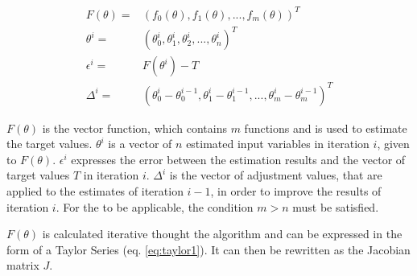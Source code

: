 \begin{align}
	F(\theta) =& (f_0(\theta), f_1(\theta),...,f_m(\theta))^T \\
	\theta^{i} =& (\theta^{i}_0, \theta^{i}_1, \theta^{i}_2,...,\theta^{i}_n)^T \\
	\epsilon^{i} =& F(\theta^{i}) - T \\
	\Delta^{i} =& (\theta^{i}_0 - \theta^{i-1}_0, \theta^{i}_1 - \theta^{i-1}_1, ..., \theta^{i}_m - \theta^{i-1}_m)^T %
\end{align}

$F(\theta)$ is the vector function, which contains $m$ functions and is
used to estimate the target values. $\theta^i$ is a vector of $n$ estimated input variables in iteration $i$, given to $F(\theta)$.
$\epsilon^i$ expresses the error between the estimation results and the vector of target values $T$ in iteration $i$.
$\Delta^i$ is the vector of adjustment values, that are applied to the estimates of  iteration $i-1$, in order to improve the results of iteration $i$.
For the  to be applicable, the condition $m > n$ must be satisfied.\newline

$F(\theta)$ is calculated iterative thought the algorithm and can be expressed in the form of a Taylor Series (eq. \ref*{eq:taylor1}). It can
then be rewritten as the Jacobian matrix $J$.

